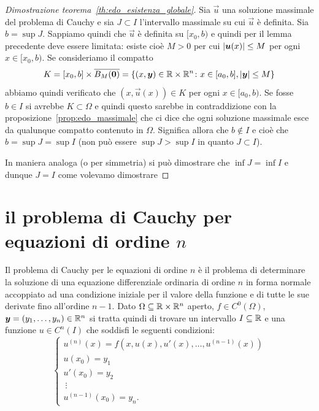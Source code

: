 \begin{proof}[Dimostrazione teorema~\ref{th:edo_esistenza_globale}]
Sia $\vec u$ una soluzione massimale del problema di Cauchy e sia
$J\subset I$ l'intervallo massimale su cui $\vec u$ è definita.
Sia $b=\sup J$. Sappiamo quindi che $\vec u$ è definita su $[x_0,b)$
e quindi per il lemma precedente deve essere limitata: esiste cioè
$M>0$ per cui ${\left|\boldsymbol u(x)\right|}\le M$ per ogni $x\in[x_0,b)$.
Se consideriamo il compatto
\[
K=[x_0,b] \times \overline{B_M(\boldsymbol 0)}
 = {\left\{ (x,\boldsymbol y)\in {\mathbb R} \times {\mathbb R}^n\colon x\in [a_0,b], {\left|\boldsymbol y\right|}\le M \right\}}
\]
abbiamo quindi verificato che $(x,\vec u(x))\in K$ per ogni $x\in [a_0,b)$.
Se fosse $b\in I$ si avrebbe $K\subset \Omega$ e quindi questo sarebbe
in contraddizione con la proposizione~\ref{prop:edo_massimale} che
ci dice che ogni soluzione massimale esce da qualunque compatto contenuto
in $\Omega$. Significa allora che $b\not \in I$ e cioè che $b = \sup J = \sup I$
(non può essere $\sup J>\sup I$ in quanto $J\subset I$).

In maniera analoga (o per simmetria) si può dimostrare che $\inf J=\inf I$
e dunque $J=I$ come volevamo dimostrare
\end{proof}

\section{il problema di Cauchy per equazioni di ordine $n$}

Il problema di Cauchy per le equazioni di ordine $n$ è il problema di
determinare la soluzione di una equazione differenziale ordinaria di ordine $n$
in forma normale accoppiato ad una condizione iniziale per il valore della
funzione e di tutte le sue derivate fino all'ordine $n-1$.
Dato $\Omega\subseteq {\mathbb R}\times {\mathbb R}^n$ aperto, $f\in C^0(\Omega)$,
$\boldsymbol y = (y_1, \dots, y_n) \in {\mathbb R}^n$
si tratta quindi di trovare un intervallo $I\subseteq {\mathbb R}$ e una funzione
$u\in C^n(I)$ che soddisfi le seguenti condizioni:
\begin{equation}\label{eq:problema_cauchy_ordine_n}
  \begin{cases}
    u^{(n)}(x) = f(x,u(x), u'(x), \dots, u^{(n-1)}(x))\\
    u(x_0) = y_1 \\
    u'(x_0) = y_2 \\
    \ \vdots \\
    u^{(n-1)}(x_0) = y_n.
  \end{cases}
\end{equation}

